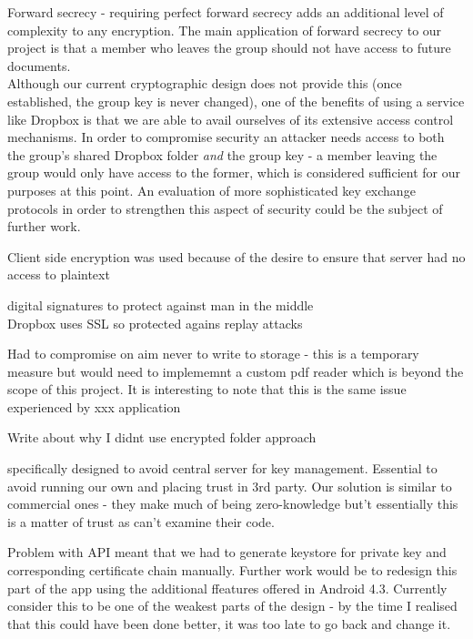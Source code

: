 Forward secrecy - requiring perfect forward secrecy adds an additional level of complexity to any encryption.   The main application of forward secrecy to our project is that a member who leaves the group should not have access to future documents.\\  Although our current cryptographic design does not provide this (once established, the group key is never changed), one of the benefits of using a service like Dropbox is that we are able to avail ourselves of its extensive access control mechanisms.  In order to compromise security an attacker needs access to both the group's shared Dropbox folder \textit{and } the group key - a member leaving the group would only have access to the former, which is considered sufficient for our purposes at this point.  An evaluation of more sophisticated key exchange protocols in order to strengthen this aspect of security could be the subject of further work. 

 
 Client side encryption was used because of the desire to ensure that server had no access to plaintext
 
 digital signatures to protect against man in the middle \\
 
 Dropbox uses SSL so protected agains replay attacks
 
 Had to compromise on aim never to write to storage - this is a temporary measure but would need to implememnt a custom pdf reader which is beyond the scope of this project.  It is interesting to note that this is the same issue experienced by xxx application
 
 Write about why I didnt use encrypted folder approach
 
 
specifically designed to avoid central server for key management.  Essential to avoid running our own and placing trust in 3rd party.  Our solution is similar to commercial ones - they make much of being zero-knowledge but't  essentially this is a matter of trust as can't examine their code.
 
 Problem with API meant that we had to generate keystore for private key and corresponding certificate chain manually.  Further work would be to redesign this part of the app using the additional ffeatures offered in Android 4.3.  Currently consider this to be one of the weakest parts of the design - by the time I realised that this could have been done better, it was too late to go back and change it.
 
